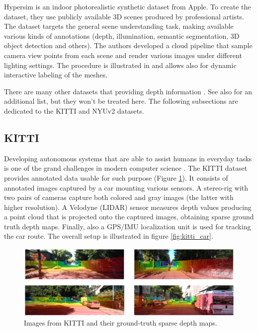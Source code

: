 Hypersim \cite{Hypersim} is an indoor photorealistic synthetic dataset from Apple.
To create the dataset, they use publicly available 3D scenes produced by professional artists.
The dataset targets the general scene understanding task, making available various kinds of annotations (depth, illumination, semantic segmentation, 3D object detection and others).
The authors developed a cloud pipeline that sample camera view points from each scene and render various images under different lighting settings.
The procedure is illustrated in \cite{Hypersim} and allows also for dynamic interactive labeling of the meshes.

There are many other datasets that providing depth information \cite{Cityscapes, saxena5, ETH, DIODE, SYNTHIA, DispNet}.
See also \cite{MiDas} for an additional list, but they won't be treated here.
The following subsections are dedicated to the KITTI and NYUv2 datasets.

\subsection{KITTI}
Developing autonomous systems that are able to assist humans in everyday tasks is one of the grand challenges in modern computer science \cite{KITTI}.
The KITTI dataset \cite{KITTI} provides annotated data usable for such purpose (Figure \ref{fig:kitti_example}).
It consists of annotated images captured by a car mounting various sensors.
A stereo-rig with two pairs of cameras capture both colored and gray images (the latter with higher resolution).
A Velodyne (LIDAR) sensor measures depth values producing a point cloud that is projected onto the captured images, obtaining sparse ground truth depth maps.
Finally, also a GPS/IMU localization unit is used for tracking the car route.
The overall setup is illustrated in figure \ref{fig:kitti_car}.

\begin{figure}
	\begin{adjustwidth}{-0.2\textwidth}{-0.2\textwidth}
	\centering
    \includegraphics[scale=0.4]{figs/kitti_example_2}
	\end{adjustwidth}
    \caption{
        Images from KITTI and their ground-truth sparse depth maps.
        \label{fig:kitti_example}
    }
\end{figure}

